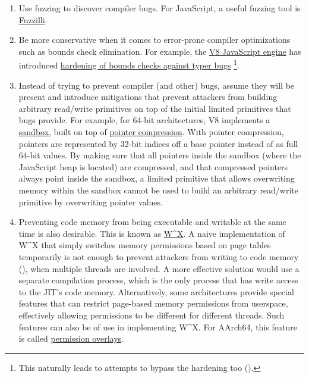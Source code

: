\documentclass[
  a4paper,
]{report}
\providecommand{\tightlist}{%
  \setlength{\itemsep}{0pt}\setlength{\parskip}{0pt}}
\begin{document}
\begin{enumerate}
\def\labelenumi{\arabic{enumi}.}
\tightlist
\item
  Use fuzzing to discover compiler bugs. For JavaScript, a useful
  fuzzing tool is
  \href{https://github.com/googleprojectzero/fuzzilli}{Fuzzilli}.
\item
  Be more conservative when it comes to error-prone compiler
  optimizations such as bounds check elimination. For example, the
  \href{https://v8.dev/}{V8 JavaScript engine} has introduced
  \href{https://bugs.chromium.org/p/v8/issues/detail?id=8806}{hardening
  of bounds checks against typer bugs} \footnote{This naturally leads to
    attempts to bypass the hardening too
    ().}.
\item
  Instead of trying to prevent compiler (and other) bugs, assume they
  will be present and introduce mitigations that prevent attackers from
  building arbitrary read/write primitives on top of the initial limited
  primitives that bugs provide. For example, for 64-bit architectures,
  V8 implements a
  \href{https://docs.google.com/document/d/1FM4fQmIhEqPG8uGp5o9A-mnPB5BOeScZYpkHjo0KKA8/edit}{sandbox},
  built on top of
  \href{https://v8.dev/blog/pointer-compression}{\label{__index_entry_95}{pointer
  compression}}. With pointer compression,
  pointers are represented by 32-bit indices off a base pointer instead
  of as full 64-bit values. By making sure that all pointers inside the
  sandbox (where the JavaScript heap is located) are compressed, and
  that compressed pointers always point inside the sandbox, a limited
  primitive that allows overwriting memory within the sandbox cannot be
  used to build an arbitrary read/write primitive by overwriting pointer
  values.
\item
  Preventing code memory from being executable and writable at the same
  time is also desirable. This is known as
  \href{https://en.wikipedia.org/wiki/W\%5EX}{\label{__index_entry_96}{W\^{}X}}.
  A naive implementation of W\^{}X that simply switches memory
  permissions based on page tables temporarily is not enough to prevent
  attackers from writing to code memory (), when multiple threads are involved. A more effective
  solution would use a separate compilation process, which is the only
  process that has write access to the JIT's code memory. Alternatively,
  some architectures provide special features that can restrict
  page-based memory permissions from userspace, effectively allowing
  permissions to be different for different threads. Such features can
  also be of use in implementing W\^{}X. For AArch64, this feature is
  called
  \href{https://developer.arm.com/documentation/102376/0200/Permission-indirection-and-permission-overlay-extensions}{permission
  overlays}.
\end{enumerate}
\end{document}
